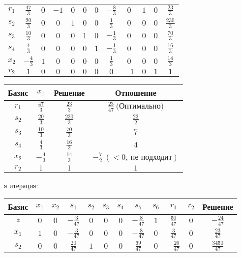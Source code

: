 \documentclass{article}%
\begin{document}
\begin{flushleft}
\begin{tabular}{|c|cccccccccc|c|}
\hline%
$r_{1}$&$\frac{47}{3}$&$0$&$-1$&$0$&$0$&$0$&$-\frac{8}{3}$&$0$&$1$&$0$&$\frac{23}{3}$\\%
$s_{2}$&$\frac{20}{3}$&$0$&$0$&$1$&$0$&$0$&$\frac{1}{3}$&$0$&$0$&$0$&$\frac{230}{3}$\\%
$s_{3}$&$\frac{10}{3}$&$0$&$0$&$0$&$1$&$0$&$-\frac{1}{3}$&$0$&$0$&$0$&$\frac{70}{3}$\\%
$s_{4}$&$\frac{4}{3}$&$0$&$0$&$0$&$0$&$1$&$-\frac{1}{3}$&$0$&$0$&$0$&$\frac{16}{3}$\\%
$x_{2}$&$-\frac{4}{3}$&$1$&$0$&$0$&$0$&$0$&$\frac{1}{3}$&$0$&$0$&$0$&$\frac{14}{3}$\\%
$r_{2}$&$1$&$0$&$0$&$0$&$0$&$0$&$0$&$-1$&$0$&$1$&$1$\\%
\hline%
\end{tabular}%
\newline%
\newline%
\newline%
\begin{tabular}{|cccc|}%
\hline%
Базис&$x_{1}$&Решение&Отношение\\%
\hline%
$r_{1}$&$\frac{47}{3}$&$\frac{23}{3}$&$\frac{23}{47}\: \text{(Оптимально)}$\\%
$s_{2}$&$\frac{20}{3}$&$\frac{230}{3}$&$\frac{23}{2}$\\%
$s_{3}$&$\frac{10}{3}$&$\frac{70}{3}$&$7$\\%
$s_{4}$&$\frac{4}{3}$&$\frac{16}{3}$&$4$\\%
$x_{2}$&$-\frac{4}{3}$&$\frac{14}{3}$&$-\frac{7}{2}\: (< 0, \: \text{не подходит})$\\%
$r_{2}$&$1$&$1$&$1$\\%
\hline%
\end{tabular}%
\newline%
\newline%
я итерация: %
\newline%
\newline%
\renewcommand{\arraystretch}{1.3}%
\begin{tabular}{|c|cccccccccc|c|}%
\hline%
Базис&$x_{1}$&$x_{2}$&$s_{1}$&$s_{2}$&$s_{3}$&$s_{4}$&$s_{5}$&$s_{6}$&$r_{1}$&$r_{2}$&Решение\\%
\hline%
$z$&$0$&$0$&$-\frac{3}{47}$&$0$&$0$&$0$&$-\frac{8}{47}$&$1$&$\frac{50}{47}$&$0$&$-\frac{24}{47}$\\%
\hline%
$x_{1}$&$1$&$0$&$-\frac{3}{47}$&$0$&$0$&$0$&$-\frac{8}{47}$&$0$&$\frac{3}{47}$&$0$&$\frac{23}{47}$\\%
$s_{2}$&$0$&$0$&$\frac{20}{47}$&$1$&$0$&$0$&$\frac{69}{47}$&$0$&$-\frac{20}{47}$&$0$&$\frac{3450}{47}$\\%

\end{tabular}
\end{flushleft}
\end{document}
